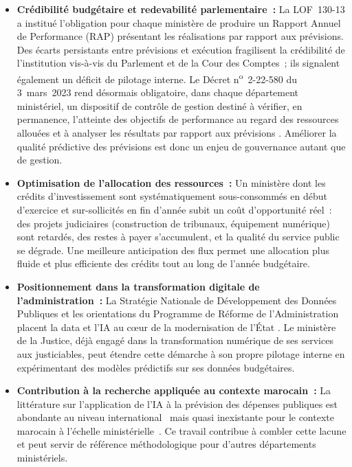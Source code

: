\begin{itemize}
    \item \textbf{Cr\'edibilit\'e budg\'etaire et redevabilit\'e parlementaire~:}
    La LOF~130-13 a institu\'e l'obligation pour chaque minist\`ere de produire un Rapport Annuel de Performance (RAP) pr\'esentant les r\'ealisations par rapport aux pr\'evisions. Des \'ecarts persistants entre pr\'evisions et ex\'ecution fragilisent la cr\'edibilit\'e de l'institution vis-\`a-vis du Parlement et de la Cour des Comptes~; ils signalent \'egalement un d\'eficit de pilotage interne. Le D\'ecret n\textsuperscript{o}~2-22-580 du 3~mars~2023 rend d\'esormais obligatoire, dans chaque d\'epartement minist\'eriel, un dispositif de contr\^ole de gestion destin\'e \`a \og{}v\'erifier, en permanence, l'atteinte des objectifs de performance au regard des ressources allou\'ees et \`a analyser les r\'esultats par rapport aux pr\'evisions\fg{} \citep{DecretCDG2023}. Am\'eliorer la qualit\'e pr\'edictive des pr\'evisions est donc un enjeu de gouvernance autant que de gestion.

    \item \textbf{Optimisation de l'allocation des ressources~:}
    Un minist\`ere dont les cr\'edits d'investissement sont syst\'ematiquement sous-consomm\'es en d\'ebut d'exercice et sur-sollicit\'es en fin d'ann\'ee subit un co\^ut d'opportunit\'e r\'eel~: des projets judiciaires (construction de tribunaux, \'equipement num\'erique) sont retard\'es, des restes \`a payer s'accumulent, et la qualit\'e du service public se d\'egrade. Une meilleure anticipation des flux permet une allocation plus fluide et plus efficiente des cr\'edits tout au long de l'ann\'ee budg\'etaire.

    \item \textbf{Positionnement dans la transformation digitale de l'administration~:}
    La Strat\'egie Nationale de D\'eveloppement des Donn\'ees Publiques et les orientations du Programme de R\'eforme de l'Administration placent la data et l'IA au c\oe{}ur de la modernisation de l'\'Etat \citep{MEF2020}. Le minist\`ere de la Justice, d\'ej\`a engag\'e dans la transformation num\'erique de ses services aux justiciables, peut \'etendre cette d\'emarche \`a son propre pilotage interne en exp\'erimentant des mod\`eles pr\'edictifs sur ses donn\'ees budg\'etaires.

    \item \textbf{Contribution \`a la recherche appliqu\'ee au contexte marocain~:}
    La litt\'erature sur l'application de l'IA \`a la pr\'evision des d\'epenses publiques est abondante au niveau international~\citep{Frankel2011, Leal2008} mais quasi inexistante pour le contexte marocain \`a l'\'echelle minist\'erielle~\citep{Roussey2011}. Ce travail contribue \`a combler cette lacune et peut servir de r\'ef\'erence m\'ethodologique pour d'autres d\'epartements minist\'eriels.
\end{itemize}

